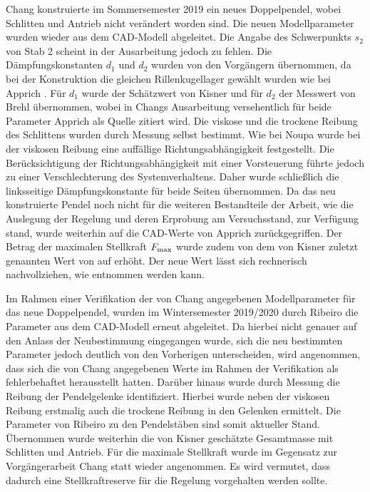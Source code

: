 Chang \cite{chang} konstruierte im Sommersemester 2019 ein neues Doppelpendel, wobei Schlitten und Antrieb nicht verändert worden sind. Die neuen Modellparameter wurden wieder aus dem CAD-Modell abgeleitet. Die Angabe des Schwerpunkts $s_2$ von Stab 2 scheint in der Ausarbeitung jedoch zu fehlen. Die Dämpfungskonstanten $d_1$ und $d_2$ wurden von den Vorgängern übernommen, da bei der Konstruktion die gleichen Rillenkugellager gewählt wurden wie bei Apprich \cite{apprich}. Für $d_1$ wurde der Schätzwert von Kisner \cite{kisner} und für $d_2$ der Messwert von Brehl \cite{brehl} übernommen, wobei in Changs Ausarbeitung versehentlich für beide Parameter Apprich \cite{apprich} als Quelle zitiert wird. Die viskose und die trockene Reibung des Schlittens wurden durch Messung selbst bestimmt. Wie bei Noupa \cite{noupa} wurde bei der viskosen Reibung eine auffällige Richtungsabhängigkeit festgestellt. Die Berücksichtigung der Richtungsabhängigkeit mit einer Vorsteuerung führte jedoch zu einer Verschlechterung des Systemverhaltens. Daher wurde schließlich die linksseitige Dämpfungskonstante für beide Seiten übernommen. Da das neu konstruierte Pendel noch nicht für die weiteren Bestandteile der Arbeit, wie die Auslegung der Regelung und deren Erprobung am Versuchsstand, zur Verfügung stand, wurde weiterhin auf die CAD-Werte von Apprich \cite{apprich} zurückgegriffen. Der Betrag der maximalen Stellkraft $F_{\mathrm{max}}$ wurde zudem von dem von Kisner \cite{kisner} zuletzt genannten Wert von  auf  erhöht. Der neue Wert lässt sich rechnerisch nachvollziehen, wie  entnommen werden kann.

Im Rahmen einer Verifikation der von Chang \cite{chang} angegebenen Modellparameter für das neue Doppelpendel, wurden im Wintersemester 2019/2020 durch Ribeiro \cite{ribeiro} die Parameter aus dem CAD-Modell erneut abgeleitet. Da hierbei nicht genauer auf den Anlass der Neubestimmung eingegangen wurde, sich die neu bestimmten Parameter jedoch deutlich von den Vorherigen unterscheiden, wird angenommen, dass sich die von Chang \cite{chang} angegebenen Werte im Rahmen der Verifikation als fehlerbehaftet herausstellt hatten. 
Darüber hinaus wurde durch Messung die Reibung der Pendelgelenke identifiziert. Hierbei wurde neben der viskosen Reibung erstmalig auch die trockene Reibung in den Gelenken ermittelt. Die Parameter von Ribeiro \cite{ribeiro} zu den Pendelstäben sind somit aktueller Stand. Übernommen wurde weiterhin die von Kisner \cite{kisner} geschätzte Gesamtmasse mit Schlitten und Antrieb. Für die maximale Stellkraft wurde im Gegensatz zur Vorgängerarbeit Chang \cite{chang} statt  wieder  angenommen. Es wird vermutet, dass dadurch eine Stellkraftreserve für die Regelung vorgehalten werden sollte.


